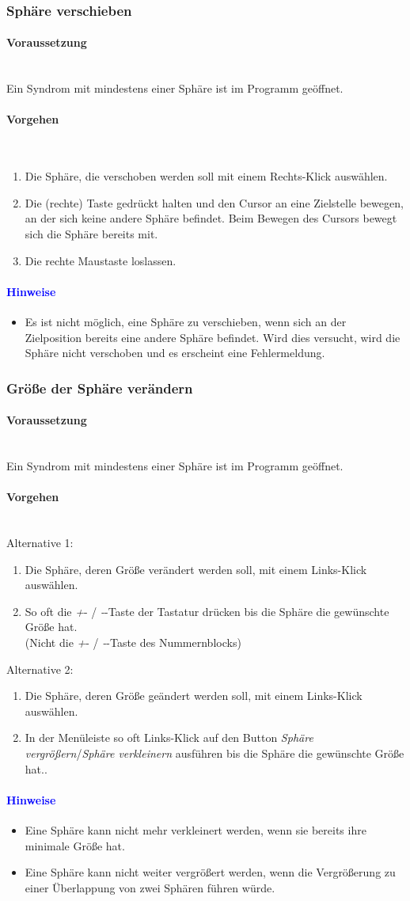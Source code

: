 \documentclass[enabledeprecatedfontcommands,fontsize=11pt,paper=a4,twoside]{scrartcl}
\newcommand*{\hint}{\paragraph{\textcolor{blue}{Hinweise}}}
\newcommand*{\condition}{\paragraph{Voraussetzung}$\;$ \vspace{0.2cm}\\}
\newcommand*{\actions}{\paragraph{Vorgehen} $\;$\vspace{0.2cm}\\}
\begin{document}
		\subsubsection{Sphäre verschieben}
				\condition 	
		Ein Syndrom mit mindestens einer Sphäre ist im Programm geöffnet. 
		\actions  
		\begin{enumerate}
			\item Die Sphäre, die verschoben werden soll mit einem Rechts-Klick auswählen.
			\item Die (rechte) Taste gedrückt halten und den Cursor an eine Zielstelle bewegen, an der sich keine andere Sphäre befindet. Beim Bewegen des Cursors bewegt sich die Sphäre bereits mit. 
			\item Die rechte Maustaste loslassen.
		\end{enumerate}
		\hint
		\begin{itemize}
			\item Es ist nicht möglich, eine Sphäre zu verschieben, wenn sich an der Zielposition bereits eine andere Sphäre befindet. Wird dies versucht, wird die Sphäre nicht verschoben und es erscheint eine Fehlermeldung.
		\end{itemize}
		\subsubsection{Größe der Sphäre verändern}
				\condition 	
		Ein Syndrom mit mindestens einer Sphäre ist im Programm geöffnet. 
		\actions  
		Alternative 1:
		\begin{enumerate}
			\item Die Sphäre, deren Größe verändert werden soll, mit einem Links-Klick auswählen.
			\item So oft die \glqq\textit{+}\grqq- / \glqq\textit{-}\grqq-Taste der Tastatur drücken bis die Sphäre die gewünschte Größe hat. \\(Nicht die \glqq\textit{+}\grqq- / \glqq\textit{-}\grqq-Taste des Nummernblocks)
		\end{enumerate}
		Alternative 2:
			\begin{enumerate}
			\item Die Sphäre, deren Größe geändert werden soll, mit einem Links-Klick auswählen.
			\item In der Menüleiste so oft  Links-Klick auf den Button \textit{Sphäre vergrößern}/\textit{Sphäre verkleinern} ausführen bis die Sphäre die gewünschte Größe hat.. 
		\end{enumerate}
		\hint
		\begin{itemize}
			\item Eine Sphäre kann nicht mehr verkleinert werden, wenn sie bereits ihre minimale Größe hat.
			\item Eine Sphäre kann nicht weiter vergrößert werden, wenn die Vergrößerung zu einer Überlappung von zwei Sphären führen würde.
			\end{itemize}
\end{document}
